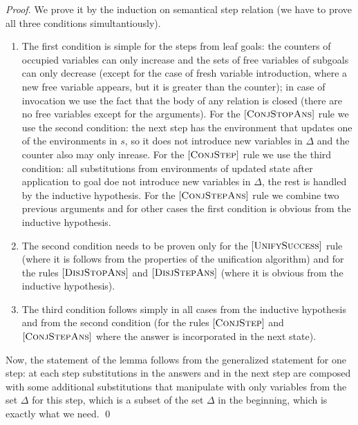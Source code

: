 \begin{proof}
We prove it by the induction on semantical step relation (we have to prove all three conditions simultantiously).

\begin{enumerate}
\item The first condition is simple for the steps from leaf goals: the counters of occupied variables can only increase and the sets of free variables of subgoals can only decrease (except for the case of fresh variable introduction, where a new free variable appears, but it is greater than the counter); in case of invocation we use the fact that the body of any relation is closed (there are no free variables except for the arguments). For the $\mbox{[\textsc{ConjStopAns}]}$ rule we use the second condition: the next step has the environment that updates one of the environments in $s$, so it does not introduce new variables in $\Delta$ and the counter also may only inrease. For the $\mbox{[\textsc{ConjStep}]}$ rule we use the third condition: all substitutions from environments of updated state after application to goal doe not introduce new variables in $\Delta$, the rest is handled by the inductive hypothesis. For the $\mbox{[\textsc{ConjStepAns}]}$ rule we combine two previous arguments and for other cases the first condition is obvious from the inductive hypothesis.

\item The second condition needs to be proven only for the $\mbox{[\textsc{UnifySuccess}]}$ rule (where it is follows from the properties of the unification algorithm) and for the rules $\mbox{[\textsc{DisjStopAns}]}$ and $\mbox{[\textsc{DisjStepAns}]}$ (where it is obvious from the inductive hypothesis).

\item The third condition follows simply in all cases from the inductive hypothesis and from the second condition (for the rules $\mbox{[\textsc{ConjStep}]}$ and $\mbox{[\textsc{ConjStepAns}]}$ where the answer is incorporated in the next state).
\end{enumerate}

Now, the statement of the lemma follows from the generalized statement for one step: at each step substitutions in the answers and in the next step are composed with some additional substitutions that manipulate with only variables from the set $\Delta$ for this step, which is a subset of the set $\Delta$ in the beginning, which is exactly what we need.
\qed

\end{proof}

